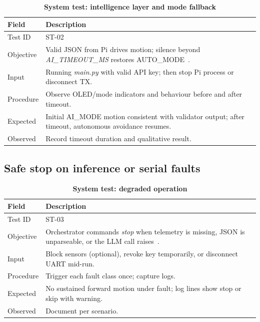 \begin{table}[H]
\centering
\caption[System test: intelligence layer and mode fallback]{\textbf{System test: intelligence layer and mode fallback}}
\label{tab:st_ai}
\begin{tabularx}{\textwidth}{|>{\raggedright\arraybackslash}p{3.1cm}|X|}
\hline
\textbf{Field} & \textbf{Description} \\
\hline
Test ID & ST-02 \\
\hline
Objective & Valid JSON from Pi drives motion; silence beyond \textit{AI\_TIMEOUT\_MS} restores AUTO\_MODE~\cite{brooks1986robust}. \\
\hline
Input & Running \textit{main.py} with valid API key; then stop Pi process or disconnect TX. \\
\hline
Procedure & Observe OLED/mode indicators and behaviour before and after timeout. \\
\hline
Expected & Initial AI\_MODE motion consistent with validator output; after timeout, autonomous avoidance resumes. \\
\hline
Observed & Record timeout duration and qualitative result. \\
\hline
\end{tabularx}
\end{table}

\subsection[Safe stop on faults]{Safe stop on inference or serial faults}
\label{subsec:st_safe}

\begin{table}[H]
\centering
\caption[System test: degraded operation]{\textbf{System test: degraded operation}}
\label{tab:st_safe}
\begin{tabularx}{\textwidth}{|>{\raggedright\arraybackslash}p{3.1cm}|X|}
\hline
\textbf{Field} & \textbf{Description} \\
\hline
Test ID & ST-03 \\
\hline
Objective & Orchestrator commands \textit{stop} when telemetry is missing, JSON is unparseable, or the LLM call raises~\cite{vemprala2024chatgpt}. \\
\hline
Input & Block sensors (optional), revoke key temporarily, or disconnect UART mid-run. \\
\hline
Procedure & Trigger each fault class once; capture logs. \\
\hline
Expected & No sustained forward motion under fault; log lines show stop or skip with warning. \\
\hline
Observed & Document per scenario. \\
\hline
\end{tabularx}
\end{table}

